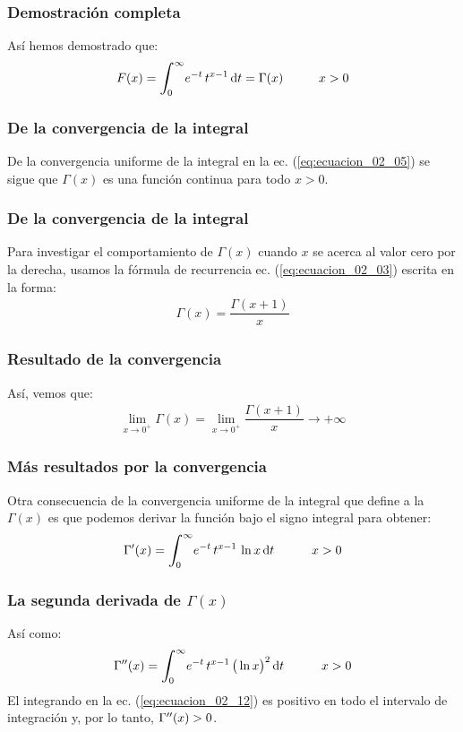\documentclass[12pt]{beamer}
\begin{document}
\begin{frame}
\frametitle{Demostración completa}
Así hemos demostrado que:
\pause
\begin{align}
F(x) = \scaleint{6ex}_{\bs 0}^{\infty} e^{-t} \, t^{x-1} \dd{t} = \Gamma (x) \hspace{1cm} x > 0
\label{eq:ecuacion_02_09}
\end{align}
\end{frame}
\begin{frame}
\frametitle{De la convergencia de la integral}
De la convergencia uniforme de la integral en la ec. (\ref{eq:ecuacion_02_05}) se sigue que $\Gamma (x)$ es una función continua para todo $x > 0$. 
\end{frame}
\begin{frame}
\frametitle{De la convergencia de la integral}
Para investigar el comportamiento de $\Gamma (x)$ cuando $x$ se acerca al valor cero por la derecha, usamos la fórmula de recurrencia ec. (\ref{eq:ecuacion_02_03}) escrita en la forma:
\pause
\begin{align*}
\Gamma (x) = \dfrac{\Gamma (x + 1)}{x}
\end{align*}
\end{frame}
\begin{frame}
\frametitle{Resultado de la convergencia}
Así, vemos que:
\pause
\begin{align}
\lim_{x \to 0^{+}} \Gamma (x) = \lim_{x \to 0^{+}} \dfrac{\Gamma (x + 1)}{x} \to +\infty
\label{eq:ecuacion_02_10}
\end{align}
\end{frame}
\begin{frame}
\frametitle{Más resultados por la convergencia}
Otra consecuencia de la convergencia uniforme de la integral que define a la $\Gamma (x)$ es que podemos derivar la función bajo el signo integral para obtener:
\pause
\begin{align}
\pderivada{\Gamma} (x) = \scaleint{6ex}_{\bs 0}^{\infty} e^{-t} \, t^{x-1} \, \ln x \dd{t} \hspace{1cm} x > 0
\label{eq:ecuacion_02_11}
\end{align}
\end{frame}
\begin{frame}
\frametitle{La segunda derivada de $\Gamma (x)$}
Así como:
\pause
\begin{align}
\sderivada{\Gamma} (x) = \scaleint{6ex}_{\bs 0}^{\infty} e^{-t} \, t^{x-1} \, \big( \ln x \big)^{2} \dd{t} \hspace{1cm} x > 0
\label{eq:ecuacion_02_12}
\end{align}
\pause
El integrando en la ec. (\ref{eq:ecuacion_02_12}) es positivo en todo el intervalo de integración y, por lo tanto, ${\Gamma}^{\prime \prime} (x) > 0$. 
\end{frame}
\end{document}
